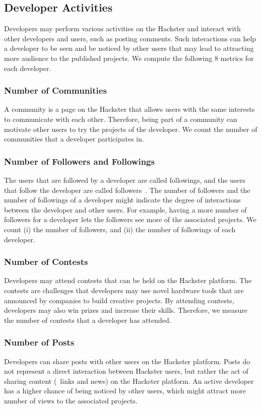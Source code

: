 \subsection{Developer Activities}
Developers may perform various activities on the Hackster and interact with other developers and users, such as posting comments. Such interactions can help a developer to be seen and be noticed by other users that may lead to attracting more audience to the published projects. We compute the following $8$ metrics for each developer.

\subsubsection*{Number of Communities}
A community is a page on the Hackster that allows users with the same interests to communicate with each other.
Therefore, being part of a community can motivate other users to try the projects of the developer.
We count the number of communities that a developer participates in.

\subsubsection*{Number of Followers and Followings}
The users that are followed by a developer are called followings, and the users that follow the developer are called followers~\cite{crawford2009following}.
The number of followers and the number of followings of a developer might indicate the degree of interactions between the developer and other users. For example, having a more number of followers for a developer lets the followers see more of the associated projects. We count (i) the number of followers, and (ii) the number of followings of each developer.

\subsubsection*{Number of Contests}
Developers may attend contests that can be held on the Hackster platform.
The contests are challenges that developers may use novel hardware tools that are announced by companies to build creative projects.
By attending contests, developers may also win prizes and increase their skills. Therefore, we measure the number of contests that a developer has attended.

\subsubsection*{Number of Posts}
Developers can share posts with other users on the Hackster platform. Posts do not represent a direct interaction between Hackster users, but rather the act of sharing content (\eg~links and news) on the Hackster platform.
An active developer has a higher chance of being noticed by other users, which might attract more number of views to the associated projects.

